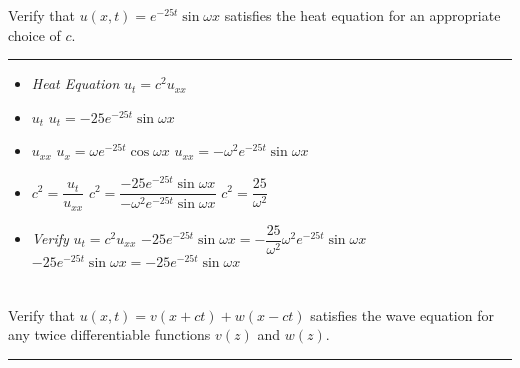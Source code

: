 \documentclass[10pt]{article}
\begin{document}
\noindent
Verify that $ u(x,t) = e^{-25t}\sin{\omega x} $ satisfies the heat equation for an appropriate choice of $ c $.  \\
\vspace{2.5mm}

\hrule 

\vspace{7.5mm}

\begin{itemize}
    \item \textit{Heat Equation} $ u_{t} = c^2u_{xx} $
    \item $ u_{t} $
    \subitem  $ u_{t} = -25e^{-25t}\sin{\omega x} $
    \item $ u_{xx} $
    \subitem $ u_{x} = \omega e^{-25t}\cos{\omega x} $
    \subitem $ u_{xx} = -\omega^2 e^{-25t}\sin{\omega x} $ 
    \item $ \displaystyle c^2 = \dfrac{u_{t}}{u_{xx}} $
    \subitem $ c^2 = \dfrac{-25e^{-25t}\sin{\omega x}}{-\omega^2 e^{-25t}\sin{\omega x}} $  
    \subitem $ \displaystyle c^2 = \dfrac{25}{\omega^2} $
    \item \textit{Verify} $ u_{t} = c^2u_{xx} $
    \subitem $ -25e^{-25t}\sin{\omega x} = -\dfrac{25}{\omega^2}\omega^2 e^{-25t}\sin{\omega x} $
    \subitem $ -25e^{-25t}\sin{\omega x} = -25e^{-25t}\sin{\omega x} $
\end{itemize}

\newpage

\section{\underline{}}
\label{sec: Problem 3}

\noindent
Verify that $ u(x,t) = v(x+ct) + w(x-ct) $ satisfies the wave equation for any twice differentiable functions $ v(z) $ and $ w(z) $.  \\
\vspace{2.5mm}

\hrule 

\vspace{7.5mm}
\end{document}
